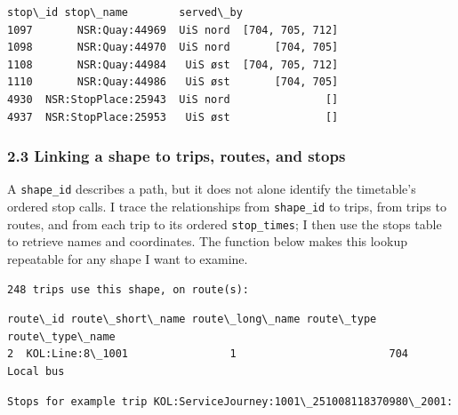 \documentclass[11pt]{article}
\begin{document}
    
    \begin{Verbatim}[commandchars=\\\{\}]
                  stop\_id stop\_name        served\_by
1097       NSR:Quay:44969  UiS nord  [704, 705, 712]
1098       NSR:Quay:44970  UiS nord       [704, 705]
1108       NSR:Quay:44984   UiS øst  [704, 705, 712]
1110       NSR:Quay:44986   UiS øst       [704, 705]
4930  NSR:StopPlace:25943  UiS nord               []
4937  NSR:StopPlace:25953   UiS øst               []
    \end{Verbatim}

    
    \subsubsection{2.3 Linking a shape to trips, routes, and
stops}\label{linking-a-shape-to-trips-routes-and-stops}

A \texttt{shape\_id} describes a path, but it does not alone identify
the timetable's ordered stop calls. I trace the relationships from
\texttt{shape\_id} to trips, from trips to routes, and from each trip to
its ordered \texttt{stop\_times}; I then use the stops table to retrieve
names and coordinates. The function below makes this lookup repeatable
for any shape I want to examine.

    \begin{Verbatim}[commandchars=\\\{\}]
248 trips use this shape, on route(s):
    \end{Verbatim}

    
    \begin{Verbatim}[commandchars=\\\{\}]
          route\_id route\_short\_name route\_long\_name route\_type route\_type\_name
2  KOL:Line:8\_1001                1                        704       Local bus
    \end{Verbatim}

    
    \begin{Verbatim}[commandchars=\\\{\}]
Stops for example trip KOL:ServiceJourney:1001\_251008118370980\_2001:
    \end{Verbatim}
\end{document}
